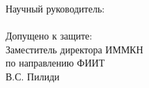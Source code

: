 {\begin{titlepage}
{    \begin{flushright}
    

    \vgap

    Научный руководитель:\\
    \supervisor\\
    \vgap
    Допущено к защите:\\
    Заместитель директора ИММКН\\
    по направлению ФИИТ\\
    \vgap
    \underline{\hspace{3cm}} В.С. Пилиди
	\end{flushright}
 


  }\end{titlepage}
  \tableofcontents
  \clearpage
} %

